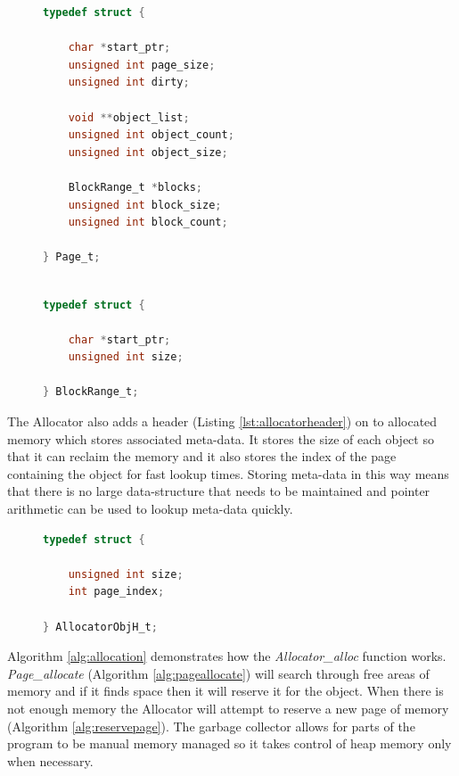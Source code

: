 \documentclass[../diss.tex]{subfiles}
\begin{document}
\begin{figure}
\begin{lstlisting}[language=C, caption=Page\_t structure with comments removed, label={lst:pagestruct}]
typedef struct {

    char *start_ptr;
    unsigned int page_size;
    unsigned int dirty;

    void **object_list;
    unsigned int object_count;
    unsigned int object_size;

    BlockRange_t *blocks;
    unsigned int block_size;
    unsigned int block_count;

} Page_t;

\end{lstlisting}
\end{figure}

\begin{figure}
\begin{lstlisting}[language=C, caption=BlockRange\_t structure with comments removed, label={lst:blockrange}]

typedef struct {

    char *start_ptr;
    unsigned int size;

} BlockRange_t;

\end{lstlisting}
\end{figure}

The Allocator also adds a header (Listing \ref{lst:allocatorheader}) on to allocated memory which stores associated meta-data. It stores the size of each object so that it can reclaim the memory and it also stores the index of the page containing the object for fast lookup times. Storing meta-data in this way means that there is no large data-structure that needs to be maintained and pointer arithmetic can be used to lookup meta-data quickly.

\begin{figure}
\begin{lstlisting}[language=C, caption=AllocatorObjH\_t structure with comments removed, label={lst:allocatorheader}]
typedef struct {

    unsigned int size;
    int page_index;

} AllocatorObjH_t;

\end{lstlisting}
\end{figure}

Algorithm \ref{alg:allocation} demonstrates how the \emph{Allocator\_alloc} function works. \emph{Page\_allocate} (Algorithm \ref{alg:pageallocate}) will search through free areas of memory and if it finds space then it will reserve it for the object. When there is not enough memory the Allocator will attempt to reserve a new page of memory (Algorithm \ref{alg:reservepage}). The garbage collector allows for parts of the program to be manual memory managed so it takes control of heap memory only when necessary.
\end{document}
